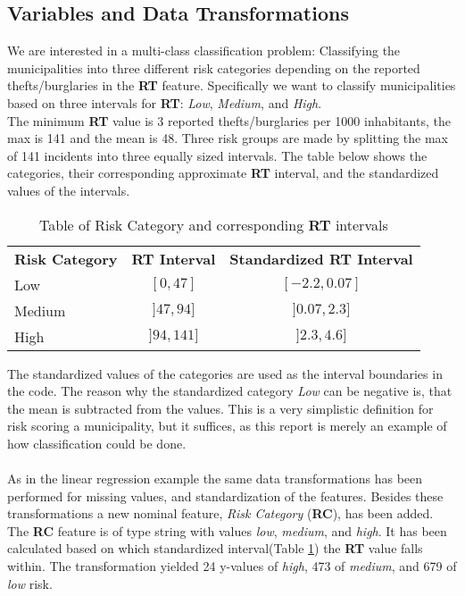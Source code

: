 \subsection{Variables and Data Transformations}
We are interested in a multi-class classification problem: Classifying the municipalities into three different risk categories depending on the reported thefts/burglaries in the \textbf{RT} feature. 
Specifically we want to classify municipalities based on three intervals for \textbf{RT}: \textit{Low}, \textit{Medium}, and \textit{High}.
\\
The minimum \textbf{RT} value is 3 reported thefts/burglaries per 1000 inhabitants, the max is 141 and the mean is 48. Three risk groups are made by splitting the max of 141 incidents into three equally sized intervals. The table below shows the categories, their corresponding approximate \textbf{RT} interval, and the standardized values of the intervals.

\begin{table}[H]
	\centering
	\begin{tabular}{|l|c|c|}
		\hline
		\textbf{Risk Category}	&	\textbf{RT Interval}	&\textbf{Standardized RT Interval} 	\\
		Low					&	$[0, 47]$			&	$[-2.2, 0.07]$	\\
		Medium				&	$]47, 94]$			&	$]0.07, 2.3]$	\\
		High				&	$]94, 141]$			&	$]2.3, 4.6]$ \\
		\hline
	\end{tabular}
	\caption{Table of Risk Category and corresponding \textbf{RT} intervals}
	\label{riskCat}
\end{table}
\noindent
The standardized values of the categories are used as the interval boundaries in the code.
The reason why the standardized category \textit{Low} can be negative is, that the mean is subtracted from the values.
This is a very simplistic definition for risk scoring a municipality, but it suffices, as this report is merely an example of how classification could be done.
\\\\
As in the linear regression example the same data transformations has been performed for missing values, and standardization of the features. 
Besides these transformations a new nominal feature, \textit{Risk Category} (\textbf{RC}), has been added. 
The \textbf{RC} feature is of type string with values \textit{low}, \textit{medium}, and \textit{high}. 
It has been calculated based on which standardized interval(Table \ref{riskCat}) the \textbf{RT} value falls within. The transformation yielded 24 y-values of \textit{high}, 473 of \textit{medium}, and 679 of \textit{low} risk.

